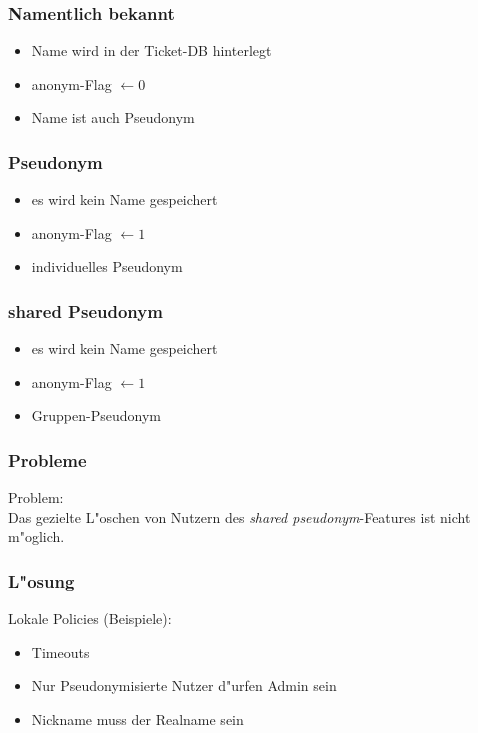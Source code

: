 
\begin{frame}
	\frametitle{Namentlich bekannt}
	\begin{itemize}
		\item<2-> Name wird in der Ticket-DB hinterlegt
		\item<3-> anonym-Flag $\leftarrow 0$ 
		\item<4-> Name ist auch Pseudonym
	\end{itemize}
\end{frame}


\begin{frame}
	\frametitle{Pseudonym}
	\begin{itemize}
		\item<2-> es wird kein Name gespeichert
		\item<3-> anonym-Flag $\leftarrow 1$  
		\item<4-> individuelles Pseudonym
	\end{itemize}
\end{frame}


\begin{frame}
	\frametitle{shared Pseudonym}
	\begin{itemize}
		\item<2-> es wird kein Name gespeichert
		\item<3-> anonym-Flag $\leftarrow 1$  
		\item<4-> Gruppen-Pseudonym  
	\end{itemize}
\end{frame}

\begin{frame}
	\frametitle{Probleme}
	Problem:\\
	Das gezielte L"oschen von Nutzern des \textit{shared pseudonym}-Features ist nicht m"oglich.
\end{frame}

\begin{frame}
	\frametitle{L"osung}
	Lokale Policies (Beispiele):
	\begin{itemize}
		\item<2-> Timeouts
		\item<3-> Nur Pseudonymisierte Nutzer d"urfen Admin sein
		\item<4-> Nickname muss der Realname sein
	\end{itemize}
\end{frame}
